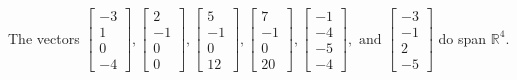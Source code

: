 \begin{exercise}
\begin{exerciseStatement}
  \end{exerciseStatement}
  \begin{exerciseAnswer}
   The vectors \(\left[\begin{array}{r}
-3 \\
1 \\
0 \\
-4
\end{array}\right] , \left[\begin{array}{r}
2 \\
-1 \\
0 \\
0
\end{array}\right] , \left[\begin{array}{r}
5 \\
-1 \\
0 \\
12
\end{array}\right] , \left[\begin{array}{r}
7 \\
-1 \\
0 \\
20
\end{array}\right] , \left[\begin{array}{r}
-1 \\
-4 \\
-5 \\
-4
\end{array}\right] , \text{ and } \left[\begin{array}{r}
-3 \\
-1 \\
2 \\
-5
\end{array}\right]\) 
  	 do  
	span \(\mathbb{R}^4\).
  


  \end{exerciseAnswer}
\end{exercise}